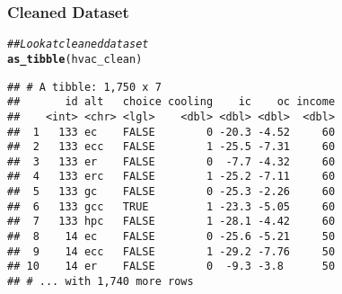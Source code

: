 \documentclass{beamer}\usepackage[]{graphicx}\usepackage[]{color}
\makeatletter
\newcommand{\hlnum}[1]{\textcolor[rgb]{0.686,0.059,0.569}{#1}}%
\newcommand{\hlcom}[1]{\textcolor[rgb]{0.678,0.584,0.686}{\textit{#1}}}%
\newcommand{\hlopt}[1]{\textcolor[rgb]{0,0,0}{#1}}%
\newcommand{\hlstd}[1]{\textcolor[rgb]{0.345,0.345,0.345}{#1}}%
\newcommand{\hlkwb}[1]{\textcolor[rgb]{0.69,0.353,0.396}{#1}}%
\newcommand{\hlkwc}[1]{\textcolor[rgb]{0.333,0.667,0.333}{#1}}%
\newcommand{\hlkwd}[1]{\textcolor[rgb]{0.737,0.353,0.396}{\textbf{#1}}}%
\newenvironment{kframe}{%
 \def\at@end@of@kframe{}%
 \ifinner\ifhmode%
  \def\at@end@of@kframe{\end{minipage}}%
  \begin{minipage}{\columnwidth}%
 \fi\fi%
 \def\FrameCommand##1{\hskip\@totalleftmargin \hskip-\fboxsep
 \colorbox{shadecolor}{##1}\hskip-\fboxsep
     \hskip-\linewidth \hskip-\@totalleftmargin \hskip\columnwidth}%
 \MakeFramed {\advance\hsize-\width
   \@totalleftmargin\z@ \linewidth\hsize
   \@setminipage}}%
 {\par\unskip\endMakeFramed%
 \at@end@of@kframe}
\newenvironment{knitrout}{}{} %
\makeatother
\begin{document}

\begin{frame}[fragile]\frametitle{Cleaned Dataset}
\begin{knitrout}\footnotesize
{}\color{fgcolor}\begin{kframe}
\begin{alltt}
\hlcom{## Look at cleaned dataset}
\hlkwd{as_tibble}\hlstd{(hvac_clean)}
\end{alltt}
\begin{verbatim}
## # A tibble: 1,750 x 7
##       id alt   choice cooling    ic    oc income
##    <int> <chr> <lgl>    <dbl> <dbl> <dbl>  <dbl>
##  1   133 ec    FALSE        0 -20.3 -4.52     60
##  2   133 ecc   FALSE        1 -25.5 -7.31     60
##  3   133 er    FALSE        0  -7.7 -4.32     60
##  4   133 erc   FALSE        1 -25.2 -7.11     60
##  5   133 gc    FALSE        0 -25.3 -2.26     60
##  6   133 gcc   TRUE         1 -23.3 -5.05     60
##  7   133 hpc   FALSE        1 -28.1 -4.42     60
##  8    14 ec    FALSE        0 -25.6 -5.21     50
##  9    14 ecc   FALSE        1 -29.2 -7.76     50
## 10    14 er    FALSE        0  -9.3 -3.8      50
## # ... with 1,740 more rows
\end{verbatim}
\end{kframe}
\end{knitrout}
\end{frame}
\end{document}
